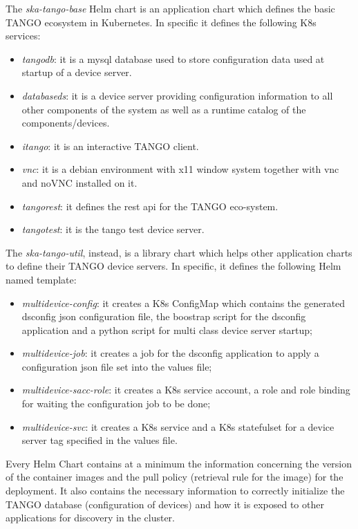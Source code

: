 \documentclass[a4paper,
               keeplastbox,   %
               ]{jacow}
\begin{document}
The \textit{ska-tango-base} Helm chart is an application chart which defines the basic TANGO ecosystem in Kubernetes. In specific it defines the following K8s services:
\begin{itemize}
    \item \textit{tangodb}: it is a mysql database used to store configuration data used at startup of a device server.
    \item \textit{databaseds}: it is a device server providing configuration information to all other components of the system as well as a runtime catalog of the components/devices.
    \item \textit{itango}: it is an interactive TANGO client.
    \item \textit{vnc}: it is a debian environment with x11 window system together with vnc\cite{vnc} and noVNC\cite{novnc} installed on it.
    \item \textit{tangorest}: it defines the rest api\cite{restapi} for the TANGO eco-system.
    \item \textit{tangotest}: it is the tango test device server\cite{tangotest}.
\end{itemize}

The \textit{ska-tango-util}, instead, is a library chart which helps other application charts to define their TANGO device servers. In specific, it defines the following Helm named template:
\begin{itemize}
    \item \textit{multidevice-config}: it creates a K8s ConfigMap which contains the generated dsconfig json configuration file, the boostrap script for the dsconfig application and a python script for multi class device server startup;
    \item \textit{multidevice-job}: it creates a job for the dsconfig application to apply a configuration json file set into the values file;
    \item \textit{multidevice-sacc-role}: it creates a K8s service account, a role and role binding for waiting the configuration job to be done;
    \item \textit{multidevice-svc}: it creates a K8s service and a K8s statefulset for a device server tag specified in the values file.
\end{itemize}

Every Helm Chart contains at a minimum the information concerning the version of the container images and the pull policy (retrieval rule for the image) for the deployment. It also contains the necessary information to correctly initialize the TANGO database (configuration of devices) and how it is exposed to other applications for discovery in the cluster.
\end{document}
